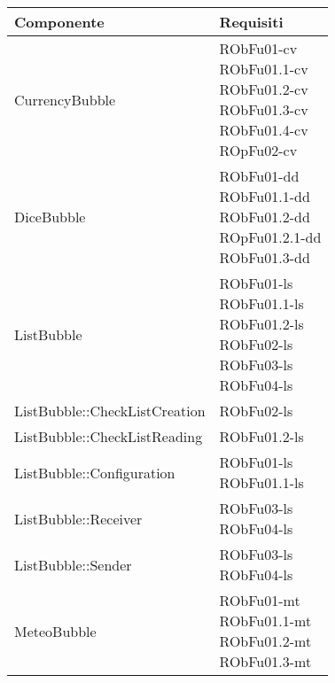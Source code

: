 \begin{center}
\begin{longtable}{|
*{1}{>{\centering\arraybackslash}m{7.5cm}|}
*{1}{>{\centering\arraybackslash}m{2.5cm}|}}
\hline \textbf{Componente} & \textbf{Requisiti}\\
\hline \endhead
\hline \endfoot

CurrencyBubble & \makecell{RObFu01-cv
\\RObFu01.1-cv
\\RObFu01.2-cv
\\RObFu01.3-cv
\\RObFu01.4-cv
\\ROpFu02-cv
\\}\\\hline
DiceBubble & \makecell{RObFu01-dd
\\RObFu01.1-dd
\\RObFu01.2-dd
\\ROpFu01.2.1-dd
\\RObFu01.3-dd
\\}\\\hline
ListBubble & \makecell{RObFu01-ls
\\RObFu01.1-ls
\\RObFu01.2-ls
\\RObFu02-ls
\\RObFu03-ls
\\RObFu04-ls
\\}\\\hline
ListBubble::CheckListCreation & \makecell{RObFu02-ls
\\}\\\hline
ListBubble::CheckListReading & \makecell{RObFu01.2-ls
\\}\\\hline
ListBubble::Configuration & \makecell{RObFu01-ls
\\RObFu01.1-ls
\\}\\\hline
ListBubble::Receiver & \makecell{RObFu03-ls
\\RObFu04-ls
\\}\\\hline
ListBubble::Sender & \makecell{RObFu03-ls
\\RObFu04-ls
\\}\\\hline
MeteoBubble & \makecell{RObFu01-mt
\\RObFu01.1-mt
\\RObFu01.2-mt
\\RObFu01.3-mt
\\}\\\hline

\end{longtable}
\end{center}
